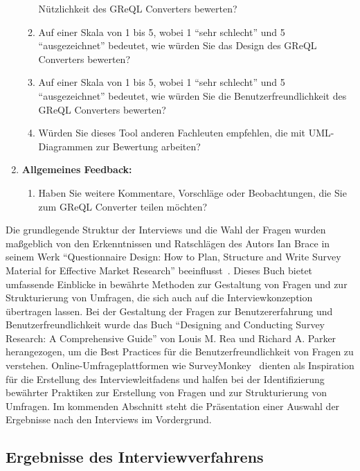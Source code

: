 \begin{enumerate}
\begin{enumerate}
        Nützlichkeit des GReQL Converters bewerten?
        \item Auf einer Skala von 1 bis 5, wobei 1 ``sehr schlecht'' und 5 ``ausgezeichnet'' bedeutet, wie würden Sie
        das Design des GReQL Converters bewerten?
        \item Auf einer Skala von 1 bis 5, wobei 1 ``sehr schlecht'' und 5 ``ausgezeichnet'' bedeutet, wie würden Sie
        die Benutzerfreundlichkeit des GReQL Converters bewerten?
        \item Würden Sie dieses Tool anderen Fachleuten empfehlen, die mit UML-Diagrammen zur Bewertung arbeiten?
    \end{enumerate}
    \item \textbf{Allgemeines Feedback:}
    \begin{enumerate}
        \item Haben Sie weitere Kommentare, Vorschläge oder Beobachtungen, die Sie zum GReQL Converter teilen möchten?
    \end{enumerate}
\end{enumerate}

Die grundlegende Struktur der Interviews und die Wahl der Fragen wurden maßgeblich von den Erkenntnissen und Ratschlägen
des Autors Ian Brace in seinem Werk ``Questionnaire Design: How to Plan, Structure and Write Survey Material for
Effective Market Research'' beeinflusst~\cite{brace2018questionnaire}. Dieses Buch bietet umfassende Einblicke in
bewährte Methoden zur Gestaltung von Fragen und zur Strukturierung von Umfragen, die sich auch auf die
Interviewkonzeption übertragen lassen. Bei der Gestaltung der Fragen zur Benutzererfahrung und Benutzerfreundlichkeit
wurde das Buch ``Designing and Conducting Survey Research: A Comprehensive Guide'' von Louis M. Rea und Richard
A. Parker~\cite{rea2014designing} herangezogen, um die Best Practices für die Benutzerfreundlichkeit von Fragen zu
verstehen. Online-Umfrageplattformen wie SurveyMonkey~\cite{monkey} dienten als Inspiration für die Erstellung des
Interviewleitfadens und halfen bei der Identifizierung bewährter Praktiken zur Erstellung von Fragen und zur
Strukturierung von Umfragen. Im kommenden Abschnitt steht die Präsentation einer Auswahl der Ergebnisse nach den
Interviews im Vordergrund.


\subsection{Ergebnisse des Interviewverfahrens}

